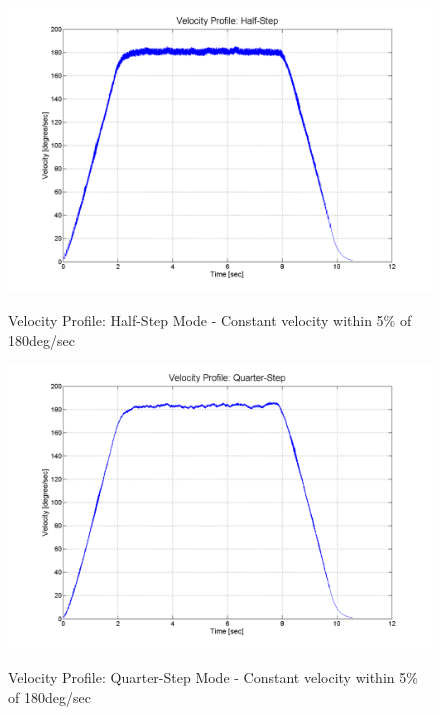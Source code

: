 \documentclass{article}
\theoremstyle{plain}
\theoremstyle{definition}
\theoremstyle{remark}
\begin{document}
\begin{figure}[h!]
\begin{center}
\includegraphics[width=12cm]{Q4_half_step.png}
\caption{Velocity Profile: Half-Step Mode - Constant velocity within 5\% of 180deg/sec} \label{tex}
\label{fig:q4_12}
\end{center}
\end{figure}

\begin{figure}[h!]
\begin{center}
\includegraphics[width=12cm]{Q4_quarter_step.png}
\caption{Velocity Profile: Quarter-Step Mode - Constant velocity within 5\% of 180deg/sec} \label{tex}
\label{fig:q4_13}
\end{center}
\end{figure}
\end{document}
